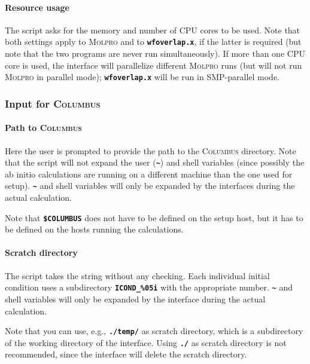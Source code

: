 \documentclass[a4paper,10pt,DIV=15,openany,twoside=false]{scrbook}
\newcommand{\ttt}[1]{\textbf{\texttt{#1}}}
\begin{document}
\paragraph{Resource usage}

The script asks for the memory and number of CPU cores to be used. Note that both settings apply to \textsc{Molpro} and to \ttt{wfoverlap.x}, if the latter is required (but note that the two programs are never run simultaneously).
If more than one CPU core is used, the interface will parallelize different \textsc{Molpro} runs (but will not run \textsc{Molpro} in parallel mode); \ttt{wfoverlap.x} will be run in SMP-parallel mode.




\subsubsection{Input for \textsc{Columbus}}

\paragraph{Path to \textsc{Columbus}}

Here the user is prompted to provide the path to the \textsc{Columbus} directory. Note that the script will not expand the user (\ttt{\textasciitilde}) and shell variables (since possibly the ab initio calculations are running on a different machine than the one used for setup). \ttt{\textasciitilde} and shell variables will only be expanded by the interfaces during the actual calculation.

Note that \ttt{\$COLUMBUS} does not have to be defined on the setup host, but it has to be defined on the hosts running the calculations.

\paragraph{Scratch directory}

The script takes the string without any checking. Each individual initial condition uses a subdirectory \ttt{ICOND\_\%05i} with the appropriate number. \ttt{\textasciitilde} and shell variables will only be expanded by the interface during the actual calculation.

Note that you can use, e.g., \ttt{./temp/} as scratch directory, which is a subdirectory of the working directory of the interface. Using \ttt{./} as scratch directory is not recommended, since the interface will delete the scratch directory.
\end{document}
